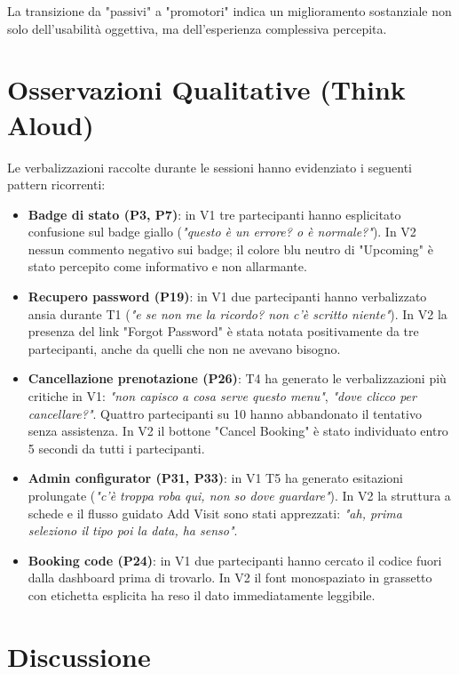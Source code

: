 La transizione da "passivi" a "promotori" indica un miglioramento sostanziale non solo dell'usabilità oggettiva, ma dell'esperienza complessiva percepita.

\section{Osservazioni Qualitative (Think Aloud)}

Le verbalizzazioni raccolte durante le sessioni hanno evidenziato i seguenti pattern ricorrenti:

\begin{itemize}
    \item \textbf{Badge di stato (P3, P7)}: in V1 tre partecipanti hanno esplicitato confusione sul badge giallo (\textit{"questo è un errore? o è normale?"}). In V2 nessun commento negativo sui badge; il colore blu neutro di "Upcoming" è stato percepito come informativo e non allarmante.

    \item \textbf{Recupero password (P19)}: in V1 due partecipanti hanno verbalizzato ansia durante T1 (\textit{"e se non me la ricordo? non c'è scritto niente"}). In V2 la presenza del link "Forgot Password" è stata notata positivamente da tre partecipanti, anche da quelli che non ne avevano bisogno.

    \item \textbf{Cancellazione prenotazione (P26)}: T4 ha generato le verbalizzazioni più critiche in V1: \textit{"non capisco a cosa serve questo menu"}, \textit{"dove clicco per cancellare?"}. Quattro partecipanti su 10 hanno abbandonato il tentativo senza assistenza. In V2 il bottone "Cancel Booking" è stato individuato entro 5 secondi da tutti i partecipanti.

    \item \textbf{Admin configurator (P31, P33)}: in V1 T5 ha generato esitazioni prolungate (\textit{"c'è troppa roba qui, non so dove guardare"}). In V2 la struttura a schede e il flusso guidato Add Visit sono stati apprezzati: \textit{"ah, prima seleziono il tipo poi la data, ha senso"}.

    \item \textbf{Booking code (P24)}: in V1 due partecipanti hanno cercato il codice fuori dalla dashboard prima di trovarlo. In V2 il font monospaziato in grassetto con etichetta esplicita ha reso il dato immediatamente leggibile.
\end{itemize}

\section{Discussione}

